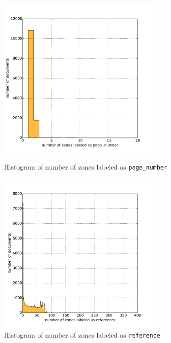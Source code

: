 \begin{figure}
\centering
\begin{minipage}[t!]{0.48\linewidth}
  \includegraphics[width=8cm]{plots/page_number_histogram}
  \caption{Histogram of number of zones labeled as \texttt{page\_number}}
  \label{fig:page_number_histogram}
\end{minipage}
\quad
\begin{minipage}[t!]{0.48\linewidth}
  \includegraphics[width=8cm]{plots/references_histogram}
  \caption{Histogram of number of zones labeled as \texttt{reference}}
  \label{fig:reference_histogram}
\end{minipage}
\end{figure}

